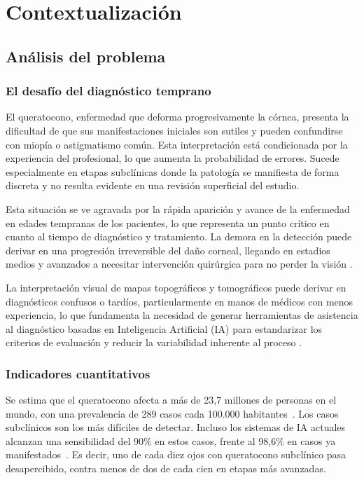 \chapter{Contextualización}

\section{Análisis del problema}

    \subsection*{El desafío del diagnóstico temprano}
    
        El queratocono, enfermedad que deforma progresivamente la córnea, presenta la dificultad de que sus manifestaciones iniciales son sutiles y pueden confundirse con miopía o astigmatismo común. Esta interpretación está condicionada por la experiencia del profesional, lo que aumenta la probabilidad de errores. Sucede especialmente en etapas subclínicas donde la patología se manifiesta de forma discreta y no resulta evidente en una revisión superficial del estudio.
    
        Esta situación se ve agravada por la rápida aparición y avance de la enfermedad en edades tempranas de los pacientes, lo que representa un punto crítico en cuanto al tiempo de diagnóstico y tratamiento. La demora en la detección puede derivar en una progresión irreversible del daño corneal, llegando en estadios medios y avanzados a necesitar intervención quirúrgica para no perder la visión \cite{deteccion_temprana}.
        
        La interpretación visual de mapas topográficos y tomográficos puede derivar en diagnósticos confusos o tardíos, particularmente en manos de médicos con menos experiencia, lo que fundamenta la necesidad de generar herramientas de asistencia al diagnóstico basadas en Inteligencia Artificial (IA) para estandarizar los criterios de evaluación y reducir la variabilidad inherente al proceso \cite{queratocono_ia}.

    \subsection*{Indicadores cuantitativos}

        Se estima que el queratocono afecta a más de 23,7 millones de personas en el mundo, con una prevalencia de 289 casos cada 100.000 habitantes~\cite{prevalencia_kc}. Los casos subclínicos son los más difíciles de detectar. Incluso los sistemas de IA actuales alcanzan una sensibilidad del 90\% en estos casos, frente al 98,6\% en casos ya manifestados~\cite{sensibilidad_ia_subclinica}. Es decir, uno de cada diez ojos con queratocono subclínico pasa desapercibido, contra menos de dos de cada cien en etapas más avanzadas.
        
